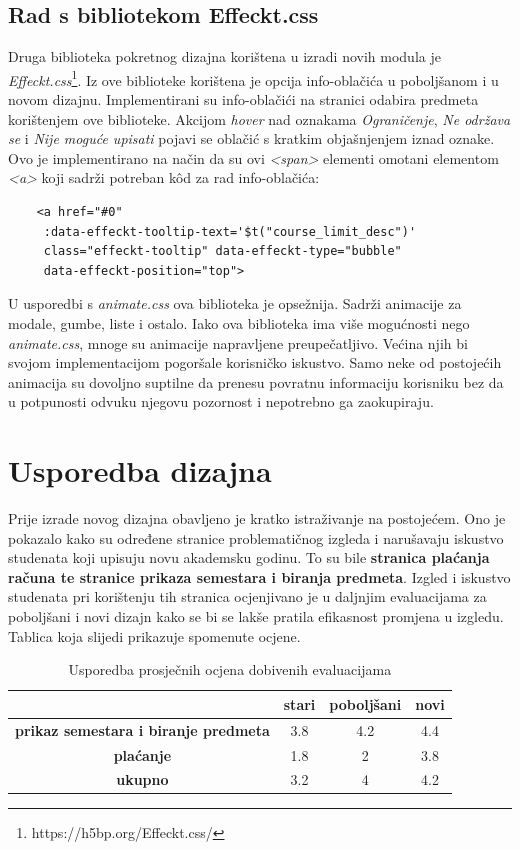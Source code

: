 \documentclass[times, utf8, zavrsni, numeric]{fer}
\begin{document}
    \section{Rad s bibliotekom Effeckt.css}
    Druga biblioteka pokretnog dizajna korištena u izradi novih modula je \textit{Effeckt.css}\footnote{https://h5bp.org/Effeckt.css/}. Iz ove biblioteke korištena je opcija info-oblačića u poboljšanom i u novom dizajnu. Implementirani su info-oblačići na stranici odabira predmeta korištenjem ove biblioteke. Akcijom \textit{hover} nad oznakama \textit{Ograničenje}, \textit{Ne održava se} i \textit{Nije moguće upisati} pojavi se oblačić s kratkim objašnjenjem iznad oznake. Ovo je implementirano na način da su ovi \textit{<span>} elementi omotani elementom \textit{<a>} koji sadrži potreban kôd za rad info-oblačića:
    \begin{verbatim}
    <a href="#0"
     :data-effeckt-tooltip-text='$t("course_limit_desc")'
     class="effeckt-tooltip" data-effeckt-type="bubble"
     data-effeckt-position="top">
    \end{verbatim}

    U usporedbi s \textit{animate.css} ova biblioteka je opsežnija. Sadrži animacije za modale, gumbe, liste i ostalo. Iako ova biblioteka ima više mogućnosti nego \textit{animate.css}, mnoge su animacije napravljene preupečatljivo. Većina njih bi svojom implementacijom pogoršale korisničko iskustvo. Samo neke od postojećih animacija su dovoljno suptilne da prenesu povratnu informaciju korisniku bez da u potpunosti odvuku njegovu pozornost i nepotrebno ga zaokupiraju.
    
\chapter{Usporedba dizajna}
    Prije izrade novog dizajna obavljeno je kratko istraživanje na postojećem. Ono je pokazalo kako su određene stranice problematičnog izgleda i narušavaju iskustvo studenata koji upisuju novu akademsku godinu. To su bile \textbf{stranica plaćanja računa te stranice prikaza semestara i biranja predmeta}. Izgled i iskustvo studenata pri korištenju tih stranica ocjenjivano je u daljnjim evaluacijama za poboljšani i novi dizajn kako se bi se lakše pratila efikasnost promjena u izgledu. Tablica koja slijedi prikazuje spomenute ocjene.
    
    \begin{table}[H]
    \begin{center}
    \caption{\label{tab:table-name}Usporedba prosječnih ocjena dobivenih evaluacijama}
    \begin{tabular}{ |c|c|c|c| }
    \hline
    & \textbf{stari} & \textbf{poboljšani} & \textbf{novi} \\
    \hline
    \textbf{prikaz semestara i biranje predmeta} & 3.8 & 4.2 & 4.4\\
    \hline
    \textbf{plaćanje} & 1.8 & 2 & 3.8\\
    \hline
    \textbf{ukupno} & 3.2 & 4 & 4.2\\ 
    \hline
    \end{tabular}
    \end{center}
    \end{table}
    
\end{document}
